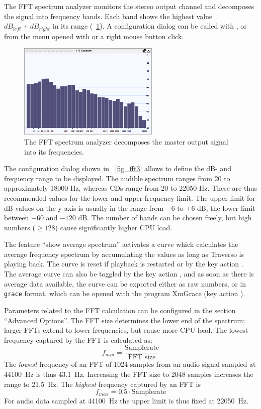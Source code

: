 The FFT spectrum analyzer monitors the stereo output channel and decomposes the signal into frequency bands. Each band shows the highest value $dB_{left} + dB_{right}$ in its range (\FigB\ \ref{fig_fft1}). A configuration dialog can be called with , or from the menu opened with  or a right mouse button click.

\begin{figure}
	\centering
	\includegraphics[width=0.6\textwidth]{../images/fft1}
	\caption{The FFT spectrum analyzer decomposes the master output signal into its frequencies.}
	\label{fig_fft1}
\end{figure}

The configuration dialog shown in \FigT\ \ref{fig_fft3} allows to define the dB- and frequency range to be displayed. The audible spectrum ranges from 20 to approximately 18000 Hz, whereas CDs range from 20 to 22050 Hz. These are thus recommended values for the lower and upper frequency limit. The upper limit for dB values on the y axis is usually in the range from $-6$ to $+6$ dB, the lower limit between $-60$ and $-120$ dB. The number of bands can be chosen freely, but high numbers ($\geq 128$) cause significantly higher CPU load.

The feature ``show average spectrum'' activates a curve which calculates the average frequency spectrum by accumulating the values as long as Traverso is playing back. The curve is reset if playback is restarted or by the key action . The average curve can also be toggled by the key action , and as soon as there is average data available, the curve can be exported either as raw numbers, or in \texttt{grace} format, which can be opened with the program XmGrace (key action ).

Parameters related to the FFT calculation can be configured in the section ``Advanced Options''. The FFT size determines the lower end of the spectrum; larger FFTs extend to lower frequencies, but cause more CPU load. The lowest frequency captured by the FFT is calculated as:
\[
f_{min} = \frac{\textrm{Samplerate}}{\textrm{FFT size}}
\]
The \emph{lowest} frequency of an FFT of 1024 samples from an audio signal sampled at 44100~Hz is thus 43.1~Hz. Increasing the FFT size to 2048 samples increases the range to 21.5~Hz. The \emph{highest} frequency captured by an FFT is
\[
f_{max} = 0.5 \cdot \textrm{Samplerate}
\]
For audio data sampled at 44100~Hz the upper limit is thus fixed at 22050~Hz.

